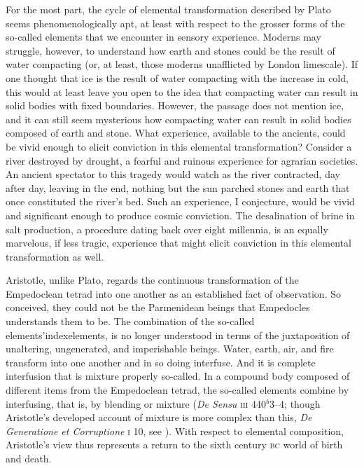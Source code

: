 For the most part, the cycle of elemental transformation described by Plato seems phenomenologically apt, at least with respect to the grosser forms of the so-called elements that we encounter in sensory experience. Moderns may struggle, however, to understand how earth and stones could be the result of water compacting (or, at least, those moderns unafflicted by London limescale). If one thought that ice is the result of water compacting with the increase in cold, this would at least leave you open to the idea that compacting water can result in solid bodies with fixed boundaries. However, the passage does not mention ice, and it can still seem mysterious how compacting water can result in solid bodies composed of earth and stone. What experience, available to the ancients, could be vivid enough to elicit conviction in this elemental transformation? Consider a river destroyed by drought, a fearful and ruinous experience for agrarian societies. An ancient spectator to this tragedy would watch as the river contracted, day after day, leaving in the end, nothing but the sun parched stones and earth that once constituted the river's bed. Such an experience, I conjecture, would be vivid and significant enough to produce cosmic conviction. The desalination of brine in salt production, a procedure dating back over eight millennia, is an equally marvelous, if less tragic, experience that might elicit conviction in this elemental transformation as well.

Aristotle, unlike Plato, regards the continuous transformation of the Empedoclean tetrad into one another as an established fact of observation. So conceived, they could not be the Parmenidean beings that Empedocles understands them to be. The combination of the so-called elements'index{elements}, is no longer understood in terms of the juxtaposition of unaltering, ungenerated, and imperishable beings. Water, earth, air, and fire transform into one another and in so doing interfuse. And it is complete interfusion that is mixture properly so-called. In a compound body composed of different items from the Empedoclean tetrad, the so-called elements combine by interfusing, that is, by blending or mixture (\emph{De Sensu} \textsc{iii} 440\( ^{b} \)3--4; though Aristotle's developed account of mixture is more complex than this, \emph{De Generatione et Corruptione} \textsc{i} 10, see \citealt{Cooper:2004fk}). With respect to elemental composition, Aristotle's view thus represents a return to the sixth century \textsc{bc} world of birth and death.

